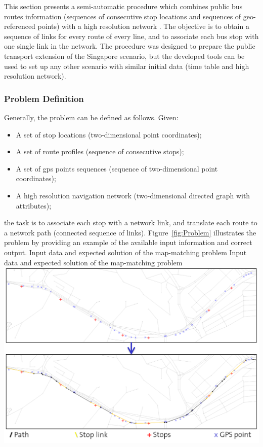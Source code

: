 This section presents a semi-automatic procedure which combines public bus routes information (sequences of consecutive stop locations and sequences of geo-referenced points) with a high resolution network \citep[][]{Ordonez_HKSTS_2011}. The objective is to obtain a sequence of links for every route of every line, and to associate each bus stop with one single link in the network. The procedure was designed to prepare the public transport extension of the Singapore scenario, but the developed tools can be used to set up any other scenario with similar initial data (time table and high resolution network).

\subsubsection{Problem Definition}
Generally, the problem can be defined as follows. Given:
%
\begin{itemize}\styleItemize
\item A set of stop locations (two-dimensional point coordinates);
\item A set of route profiles (sequence of consecutive stops);
\item A set of \gls{gps} points sequences (sequence of two-dimensional point coordinates);
\item A high resolution navigation network (two-dimensional directed graph with attributes);
\end{itemize}
%
the task is to associate each stop with a network link, and translate each route to a network path (connected sequence of links). Figure~\ref{fig:Problem} illustrates the problem by providing an example of the available input information and correct output.
%
\createfigure
{Input data and expected solution of the map-matching problem}
{Input data and expected solution of the map-matching problem}
{\label{fig:Problem}}
{\includegraphics[width=1.0\textwidth]{extending/figures/semiAuto/Problem.png}}
{}

